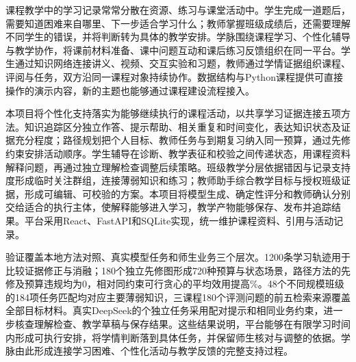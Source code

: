 课程教学中的学习记录常常分散在资源、练习与课堂活动中。学生完成一道题后，需要知道困难来自哪里、下一步适合学习什么；教师掌握班级成绩后，还需要理解不同学生的错误，并将判断转为具体的教学安排。学脉围绕课程学习、个性化辅导与教学协作，将课前材料准备、课中问题互动和课后练习反馈组织在同一平台。学生通过知识网络连接讲义、视频、交互实验和习题，教师通过学情证据组织课程、评阅与任务，双方沿同一课程对象持续协作。数据结构与Python课程提供可直接操作的演示内容，新的主题也能够通过课程建设流程接入。

本项目将个性化支持落实为能够继续执行的课程活动，以共享学习证据连接五项方法。知识追踪区分独立作答、提示帮助、相关重复和时间变化，表达知识状态及证据充分程度；路径规划把个人目标、教师任务与到期复习纳入同一预算，通过先修约束安排活动顺序。学生辅导在诊断、教学表征和校验之间传递状态，用课程资料解释问题，再通过独立理解检查调整后续策略。班级教学分层依据错因与记录支持度形成临时关注群组，连接薄弱知识和练习；教师助手综合教学目标与授权班级证据，形成可编辑、可校验的方案。本项目将模型生成、确定性评分和教师确认分别交给适合的执行主体，使解释能够进入学习，教学产物能够保存、发布并追踪结果。平台采用React、FastAPI和SQLite实现，统一维护课程资料、引用与活动记录。

验证覆盖本地方法对照、真实模型任务和师生业务三个层次。1200条学习轨迹用于比较证据修正与消融；180个独立先修图形成720种预算与状态场景，路径方法的先修及预算违规均为0，相对同约束可行贪心的平均效用提高\PathGain\%。48个不同规模班级的184项任务匹配均对应主要薄弱知识，三课程180个评测问题的前五检索来源覆盖全部目标材料。真实DeepSeek的\RealTasks{}个独立任务采用配对提示和相同业务约束，进一步核查理解检查、教学草稿与保存结果。这些结果说明，平台能够在有限学习时间内形成可执行安排，将学情判断落到具体任务，并保留师生核对与调整的依据。学脉由此形成连接学习困难、个性化活动与教学反馈的完整支持过程。
